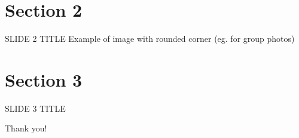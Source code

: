 \documentclass[10pt,xcolor={dvipsnames},aspectratio=169]{beamer}
\begin{document}
\section{Section 2}

\begin{frame}{SLIDE 2 TITLE}
  \center Example of image with rounded corner (eg. for group photos)

\end{frame}

\section{Section 3}

\begin{frame}{SLIDE 3 TITLE}
\end{frame}

\begin{frame}[standout]
  Thank you!
\end{frame}



%  
\end{document}
